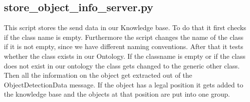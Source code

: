 \documentclass[main.tex]{subfiles}
\begin{document}
\subsection{store\_object\_info\_server.py}
This script stores the send data in our Knowledge base.
To do that it first checks if the class name is empty. Furthermore the script changes the name of the class if it is not empty, since we have different naming conventions. After that it tests whether the class exists in our Ontology. If the classname is empty or if the class does not exist in our ontology the class gets changed to the generic other class. Then all the information on the object get extracted out of the ObjectDetectionData message. If the object has a legal position it gets added to the knowledge base and the objects at that position are put into one group.

	\endgroup
\end{document}
